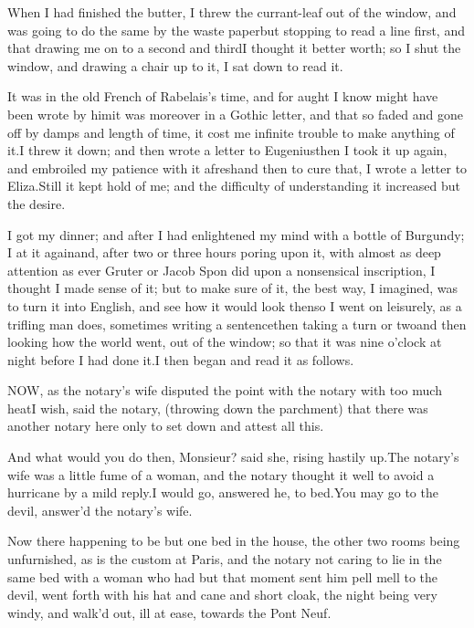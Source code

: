 \documentclass[twoside]{article}
\begin{document}
When I had finished the butter, I threw
the currant-leaf out of the window, and
was going to do the same by the waste
paper\tskk but stopping to read a line
first, and that drawing me on to a second
and third\tskk I thought it better worth;
so I shut the window, and drawing a chair
up to it, I sat down to read it.

It was in the old French of Rabelais’s
time, and for aught I know might have been
wrote by him\tskk it was moreover in a
Gothic letter, and that so faded and gone
off by damps and length of time, it cost
me infinite trouble to make anything of
it.\tskk I threw it down; and then wrote a
letter to Eugenius\tskk then I took it up
again, and embroiled my patience with it
afresh\tskk and then to cure that, I
wrote a letter to Eliza.\tskk Still it
kept hold of me; and the difficulty of
understanding it increased but the desire.

I got my dinner; and after I had
enlightened my mind with a bottle of
Burgundy; I at it again\tskk and, after
two or three hours poring upon it, with
almost as deep attention as ever Gruter or
Jacob Spon did upon a nonsensical
inscription, I thought I made sense of it;
but to make sure of it, the best way, I
imagined, was to turn it into English, and
see how it would look then\tskk so I went
on leisurely, as a trifling man does,
sometimes writing a sentence\tskk then
taking a turn or two\tskk and then
looking how the world went, out of the
window; so that it was nine o’clock at
night before I had done it.\tskk I then
began and read it as follows.





\vskip 6pt


\tskk NOW, as the notary’s wife disputed
the point with the notary with too much
heat\tskk I wish, said the notary,
(throwing down the parchment) that there
was another notary here only to set down
and attest all this.\tskk 

\tskk And what would you do then,
Monsieur? said she, rising hastily
up.\tskk The notary’s wife was a little
fume of a woman, and the notary thought it
well to avoid a hurricane by a mild
reply.\tskk I would go, answered he, to
bed.\tskk You may go to the devil,
answer’d the notary’s wife.

Now there happening to be but one bed in
the house, the other two rooms being
unfurnished, as is the custom at Paris,
and the notary not caring to lie in the
same bed with a woman who had but that
moment sent him pell mell to the devil,
went forth with his hat and cane and short
cloak, the night being very windy, and
walk’d out, ill at ease, towards the Pont
Neuf.
\end{document}
